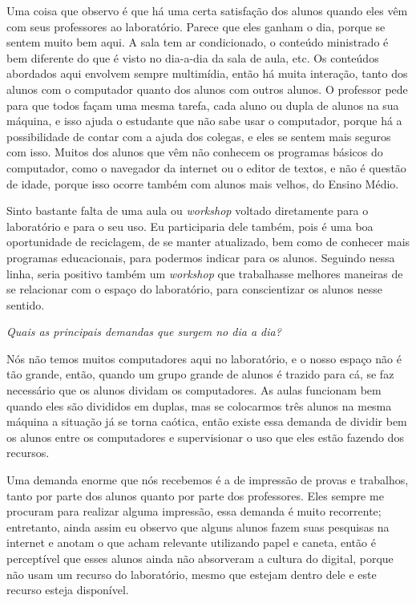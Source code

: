 Uma coisa que observo é que há uma certa satisfação dos alunos quando eles vêm com seus professores ao laboratório. Parece que eles ganham o dia, porque se sentem muito bem aqui. A sala tem ar condicionado, o conteúdo ministrado é bem diferente do que é visto no dia-a-dia da sala de aula, etc. Os conteúdos abordados aqui envolvem sempre multimídia, então há muita interação, tanto dos alunos com o computador quanto dos alunos com outros alunos. O professor pede para que todos façam uma mesma tarefa, cada aluno ou dupla de alunos na sua máquina, e isso ajuda o estudante que não sabe usar o computador, porque há a possibilidade de contar com a ajuda dos colegas, e eles se sentem mais seguros com isso. Muitos dos alunos que vêm não conhecem os programas básicos do computador, como o navegador da internet ou o editor de textos, e não é questão de idade, porque isso ocorre também com alunos mais velhos, do Ensino Médio.

Sinto bastante falta de uma aula ou \textit{workshop} voltado diretamente para o laboratório e para o seu uso. Eu participaria dele também, pois é uma boa oportunidade de reciclagem, de se manter atualizado, bem como de conhecer mais programas educacionais, para podermos indicar para os alunos. Seguindo nessa linha, seria positivo também um \textit{workshop} que trabalhasse melhores maneiras de se relacionar com o espaço do laboratório, para conscientizar os alunos nesse sentido.

\textit{Quais as principais demandas que surgem no dia a dia?}

Nós não temos muitos computadores aqui no laboratório, e o nosso espaço não é tão grande, então, quando um grupo grande de alunos é trazido para cá, se faz necessário que os alunos dividam os computadores. As aulas funcionam bem quando eles são divididos em duplas, mas se colocarmos três alunos na mesma máquina a situação já se torna caótica, então existe essa demanda de dividir bem os alunos entre os computadores e supervisionar o uso que eles estão fazendo dos recursos.

Uma demanda enorme que nós recebemos é a de impressão de provas e trabalhos, tanto por parte dos alunos quanto por parte dos professores. Eles sempre me procuram para realizar alguma impressão, essa demanda é muito recorrente; entretanto, ainda assim eu observo que alguns alunos fazem suas pesquisas na internet e anotam o que acham relevante utilizando papel e caneta, então é perceptível que esses alunos ainda não absorveram a cultura do digital, porque não usam um recurso do laboratório, mesmo que estejam dentro dele e este recurso esteja disponível.

